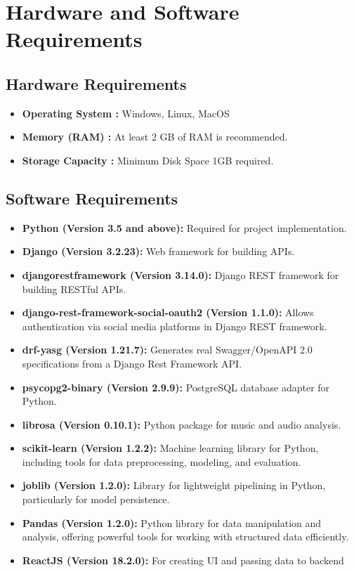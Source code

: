 \documentclass[11pt]{report}
\begin{document}
\newpage
\section{Hardware and Software Requirements}
\subsection{Hardware Requirements}

\begin{itemize}
  \item \textbf{Operating System :} Windows, Linux, MacOS 
  \item \textbf{Memory (RAM) :} At least 2 GB of RAM is recommended.
  \item \textbf{Storage Capacity :} Minimum Disk Space 1GB required.
  
\end{itemize}


\subsection{Software Requirements}

\begin{itemize}
\item \textbf{Python (Version 3.5 and above):} Required for project implementation.
\item \textbf{Django (Version 3.2.23):} Web framework for building APIs.
\item \textbf{djangorestframework (Version 3.14.0):} Django REST framework for building RESTful APIs.
\item \textbf{django-rest-framework-social-oauth2 (Version 1.1.0):} Allows authentication via social media platforms in Django REST framework.
\item \textbf{drf-yasg (Version 1.21.7):} Generates real Swagger/OpenAPI 2.0 specifications from a Django Rest Framework API.
\item \textbf{psycopg2-binary (Version 2.9.9):} PostgreSQL database adapter for Python.
\item \textbf{librosa (Version 0.10.1):} Python package for music and audio analysis.
\item \textbf{scikit-learn (Version 1.2.2):} Machine learning library for Python, including tools for data preprocessing, modeling, and evaluation.
\item \textbf{joblib (Version 1.2.0):} Library for lightweight pipelining in Python, particularly for model persistence.
\item \textbf{Pandas (Version 1.2.0):} Python library for data manipulation and analysis, offering powerful tools for working with structured data efficiently.
\item \textbf{ReactJS (Version 18.2.0):} For creating UI and passing data to backend

\end{itemize}
\end{document}
